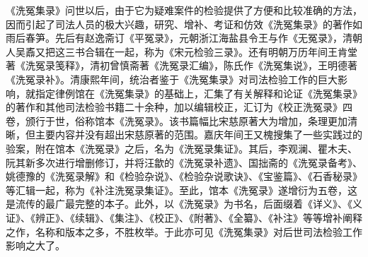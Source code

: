 \documentclass[12pt,UTF8]{ctexbook}
\begin{document}
《洗冤集录》问世以后，由于它为疑难案件的检验提供了方便和比较准确的方法，因而引起了司法人员的极大兴趣，研究、增补、考证和仿效《洗冤集录》的著作如雨后春笋。先后有赵逸斋订《平冤录》，元朝浙江海盐县令王与作《无冤录》，清朝人吴鼒又把这三书合辑在一起，称为《宋元检验三录》。还有明朝万历年间王肯堂著《洗冤录笺释》，清初曾慎斋著《洗冤录汇编》，陈氏作《洗冤集说》，王明德著《洗冤录补》。清康熙年间，统治者鉴于《洗冤集录》对司法检验工作的巨大影响，就指定律例馆在《洗冤集录》的基础上，汇集了有关解释和论证《洗冤集录》的著作和其他司法检验书籍二十余种，加以编辑校正，汇订为《校正洗冤录》四卷，颁行于世，俗称馆本《洗冤录》。该书篇幅比宋慈原著大为增加，条理更加清晰，但主要内容并没有超出宋慈原著的范围。嘉庆年间王又槐搜集了一些实践过的验案，附在馆本《洗冤录》之后，名为《洗冤录集证》。其后，李观澜、瞿木夫、阮其新多次进行增删修订，并将汪歙的《洗冤录补遗》、国拙斋的《洗冤录备考》、姚德豫的《洗冤录解》和《检验杂说》、《检验杂说歌诀》、《宝鉴篇》、《石香秘录》等汇辑一起，称为《补注洗冤录集证》。至此，馆本《洗冤录》遂增衍为五卷，这是流传的最广最完整的本子。此外，以《洗冤录》为书名，后面缀着《详义》、《义证》、《辨正》、《续辑》、《集注》、《校正》、《附著》、《全纂》、《补注》等等增补阐释之作，名称和版本之多，不胜枚举。于此亦可见《洗冤集录》对后世司法检验工作影响之大了。
\end{document}
